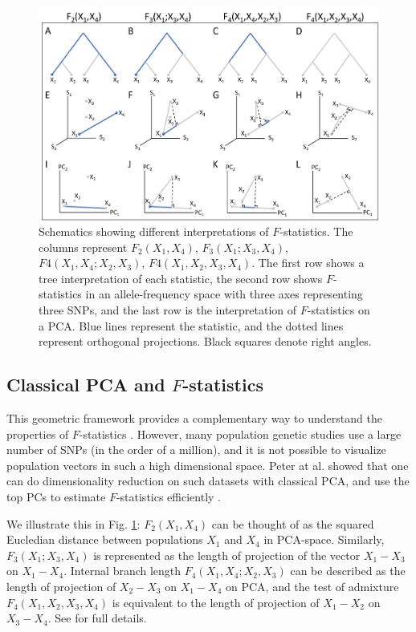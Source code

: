\documentclass[12pt]{article}
\begin{document}
\begin{figure}[ht!]
    \includegraphics[width=16.5cm]{Images/Figures/overview.png}
    \centering
    \caption{Schematics showing different interpretations of $F$-statistics. The columns represent $F_2(X_1,X_4)$, $F_3(X_1;X_3,X_4)$, $F4(X_1,X_4;X_2,X_3)$, $F4(X_1,X_2,X_3,X_4)$. The first row shows a tree interpretation of each statistic, the second row shows $F$-statistics in an allele-frequency space with three axes representing three SNPs, and the last row is the interpretation of $F$-statistics on a PCA. Blue lines represent the statistic, and the dotted lines represent orthogonal projections. Black squares denote right angles.}
    \label{fig2:overview}
\end{figure}


\subsection{Classical PCA and $F$-statistics}\label{theory-pca-fstats}

This geometric framework provides a complementary way to understand the properties of $F$-statistics \citep{oteo-garcia_geometrical_2021}. However, many population genetic studies use a large number of SNPs (in the order of a million), and it is not possible to visualize population vectors in such a high dimensional space. Peter at al. showed that one can do dimensionality reduction on such datasets with classical PCA, and use the top PCs to estimate $F$-statistics efficiently \citep{peter_geometric_2022}.

We illustrate this in Fig. \ref{fig2:overview}:  $F_2(X_1,X_4)$ can be thought of as the squared Eucledian distance between populations $X_1$ and $X_4$ in PCA-space. Similarly, $F_3(X_1;X_3,X_4)$ is represented as the length of projection of the vector $X_1-X_3$ on $X_1-X_4$. Internal branch length $F_4(X_1,X_4;X_2,X_3)$ can be described as the length of projection of $X_2-X_3$ on $X_1-X_4$ on PCA, and the test of admixture $F_4(X_1,X_2,X_3,X_4)$ is equivalent to the length of projection of $X_1-X_2$ on $X_3-X_4$. See \cite{peter_geometric_2022} for full details.
\end{document}
